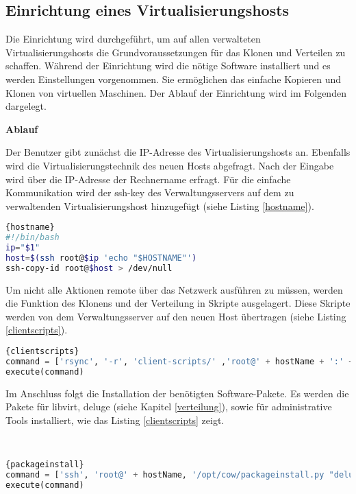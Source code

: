 \subsection{Einrichtung eines Virtualisierungshosts}\label{einrichtung}
Die Einrichtung wird durchgeführt, um auf allen verwalteten Virtualisierungshosts die Grundvoraussetzungen für das Klonen und Verteilen zu schaffen. Während der Einrichtung wird die nötige Software installiert und es werden Einstellungen vorgenommen. Sie ermöglichen das einfache Kopieren und Klonen von virtuellen Maschinen. Der Ablauf der Einrichtung wird im Folgenden dargelegt. 


\textbf{Ablauf}

{ \fontsize{12.1pt}{16pt}\selectfont
Der Benutzer gibt zunächst die IP-Adresse des Virtualisierungshosts an. Ebenfalls wird die Virtualisierungstechnik des neuen Hosts abgefragt. Nach der Eingabe wird über die IP-Adresse der Rechnername erfragt. Für die einfache Kommunikation wird der ssh-key des Verwaltungsservers auf dem zu verwaltenden Virtualisierungshost hinzugefügt (siehe Listing \ref{hostname}).
\\
\begin{lstlisting}[caption=Abruf des Rechnernamens und Kopieren des ssh-keys (hostname.sh),language=Bash,label=hostname]{hostname}
#!/bin/bash
ip="$1"
host=$(ssh root@$ip 'echo "$HOSTNAME"')
ssh-copy-id root@$host > /dev/null
\end{lstlisting}

Um nicht alle Aktionen remote über das Netzwerk ausführen zu müssen, werden die Funktion des Klonens und der Verteilung in Skripte ausgelagert. Diese Skripte werden von dem Verwaltungsserver auf den neuen Host übertragen (siehe Listing \ref{clientscripts}).
\\
\begin{lstlisting}[caption=Übertragung der Client-Skripte (cow.py),language=Python,label=clientscripts]{clientscripts}
command = ['rsync', '-r', 'client-scripts/' ,'root@' + hostName + ':' + binDir]
execute(command)
\end{lstlisting}

Im Anschluss folgt die Installation der benötigten Software-Pakete. Es werden die Pakete für libvirt, deluge (siehe Kapitel \ref{verteilung}), sowie für administrative Tools installiert, wie das Listing \ref{clientscripts} zeigt. }
\\
\begin{lstlisting}[caption=Paketinstallation auf dem Virtualisierungsserver (cow.py),language=Python,label=packageinstall]{packageinstall}
command = ['ssh', 'root@' + hostName, '/opt/cow/packageinstall.py "deluged deluge-console mktorrent libvirt-bin python-libvirt"' ]
execute(command)
\end{lstlisting}
